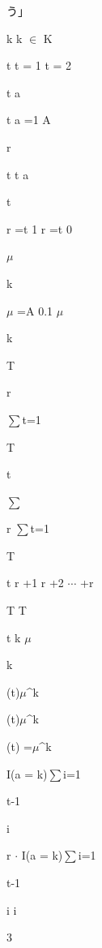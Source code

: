 う」\par
k k $\in$ K\par
t t = 1 t = 2\par
t a\par
t a  =1 A\par
r\par
t t a\par
t\par
r  =t 1 r  =t 0\par
$\mu$\par
k\par
$\mu$  =A 0.1 $\mu$\par
k\par
T\par
r\par
$\sum$t=1\par
T\par
t\par
$\sum$\par
r  $\sum$t=1\par
T\par
t r  +1 r  +2 $\cdots$ +r\par
T T\par
t k $\mu$\par
k\par
(t)$\mu$\textasciicircum{}k\par
(t)$\mu$\textasciicircum{}k\par
(t) =$\mu$\textasciicircum{}k\par
I(a  = k)$\sum$i=1\par
t-1\par
i\par
r  $\cdot$ I(a  = k)$\sum$i=1\par
t-1\par
i i\par
3\par

